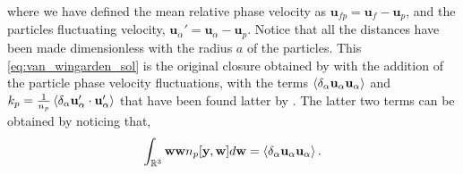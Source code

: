 where we have defined the mean relative phase velocity as $\textbf{u}_{fp} = \textbf{u}_f - \textbf{u}_p$, and the particles fluctuating velocity, $\textbf{u}_\alpha' = \textbf{u}_\alpha - \textbf{u}_p$. 
Notice that all the distances have been made dimensionless with the radius $a$ of the particles. 
This \ref{eq:van_wingarden_sol} is the original closure obtained by \citet{van1998pseudo} with the addition of the particle phase velocity fluctuations, with the terms $\left<\delta_\alpha \textbf{u}_\alpha\textbf{u}_\alpha\right>$ and $k_p = \frac{1}{n_p}\left<\delta_\alpha \textbf{u}_\alpha'\cdot\textbf{u}_\alpha'\right>$ that have been found latter by \citet[Appendix B]{zhang1994averaged}. 
The latter two terms can be obtained by noticing that, 
\begin{equation}
    \int_{\mathbb{R}^3} \textbf{ww} n_p[\textbf{y},\textbf{w}] d\textbf{w}
    = \left<\delta_\alpha \textbf{u}_\alpha\textbf{u}_\alpha\right>. 
\end{equation}


